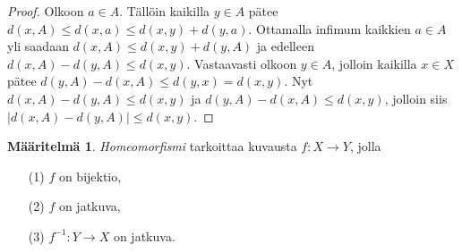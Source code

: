 \documentclass[12pt,a4paper,leqno]{report}
\theoremstyle{plain}
\theoremstyle{definition}
\newtheorem{maar}[equation]{Määritelmä}
\theoremstyle{remark}
\begin{document}
\begin{proof}
Olkoon $a\in A$. Tällöin kaikilla $y\in A$ pätee $d(x,A)\leq d(x,a)\leq d(x,y)+d(y,a)$. Ottamalla infimum kaikkien $a\in A$ yli saadaan $d(x,A)\leq d(x,y)+d(y,A)$
ja edelleen $d(x,A)-d(y,A)\leq d(x,y) $.
Vastaavasti olkoon $y\in A$, jolloin kaikilla $x\in X$ pätee $d(y,A)-d(x,A)\leq d(y,x)=d(x,y) $. Nyt $d(x,A)-d(y,A)\leq d(x,y) $ ja $d(y,A)-d(x,A)\leq d(x,y) $, jolloin siis $|d(x,A)-d(y,A)|\leq d(x,y) $.

\end{proof}

\begin{maar} \emph{Homeomorfismi} 
tarkoittaa kuvausta $f\colon X\rightarrow Y$, jolla 
\begin{itemize}
\item[(1)] $f$ on bijektio,
\item[(2)] $f$ on jatkuva,
\item[(3)] $f^{-1} \colon Y\rightarrow X$ on jatkuva. 
\end{itemize}
\end{maar}
\end{document}
